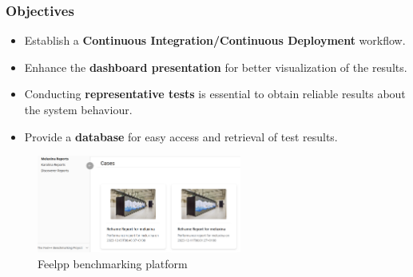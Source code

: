 \documentclass[10pt]{beamer}
\begin{document}
\begin{frame}
    \frametitle{\textbf{Objectives}}
    \begin{itemize}
        \addtolength{\itemsep}{8pt}
        \item Establish a \textbf{Continuous Integration/Continuous Deployment} workflow. \\
        \item Enhance the \textbf{dashboard presentation} for better visualization of the results. \\
        \item Conducting \textbf{representative tests} is essential to obtain reliable results about the system behaviour. \\
        \item Provide a \textbf{database} for easy access and retrieval of test results. \\
    \end{itemize}

    \begin{figure}
        \centering
        \includegraphics[width=0.6\textwidth]{../illustrations/feelpp-dashboard.png}
        \caption{Feelpp benchmarking platform}
    \end{figure}
\end{frame}
\end{document}
